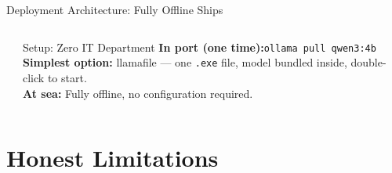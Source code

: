 \documentclass[aspectratio=169,11pt]{beamer}
\begin{document}
\begin{frame}[shrink=15]{Deployment Architecture: Fully Offline Ships}
\begin{columns}[T]
\begin{center}
\end{center}

\begin{block}{Setup: Zero IT Department}
  \scriptsize\RaggedRight
  \textbf{In port (one time):}\quad\texttt{ollama pull qwen3:4b}\\
  \textbf{Simplest option:} llamafile --- one \texttt{.exe} file,
  model bundled inside, double-click to start.\\
  \textbf{At sea:} Fully offline, no configuration required.
\end{block}
\end{columns}
\end{frame}

\section{Honest Limitations}
\end{document}
